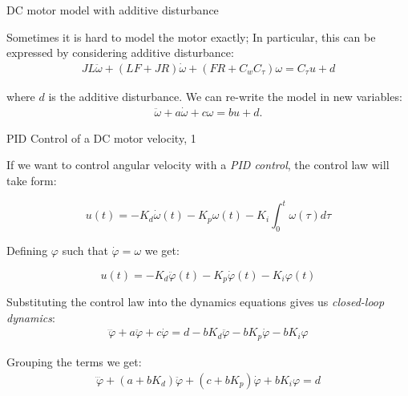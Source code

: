 \documentclass{beamer}
\begin{document}
\begin{frame}{DC motor model with additive disturbance}
	\begin{flushleft}
		
		Sometimes it is hard to model the motor exactly; In particular, this can be expressed by considering additive disturbance:
		\begin{align}
			JL \ddot \omega  + (LF+JR) \dot \omega   +( FR+C_w C_\tau)\omega =
			C_\tau u + d
		\end{align}
		
		where $d$ is the additive disturbance. We can re-write the model in new variables:
		\begin{align}
			\ddot \omega  + a\dot \omega  + c\omega =
			b u + d.
		\end{align}
		
	\end{flushleft}
\end{frame}


\begin{frame}{PID Control of a DC motor velocity, 1}
	\begin{flushleft}
		
		If we want to control angular velocity with a \emph{PID control}, the control law will take form:
		
		\begin{equation}
			u(t) =  - K_d \dot \omega(t) - K_p \omega(t) - K_i \int_0^t \omega(\tau) d\tau
		\end{equation}
		
		Defining $\varphi$ such that $\dot \varphi = \omega$ we get:
		
		\begin{equation}
			u(t) = - K_d \ddot \varphi(t) - K_p \dot \varphi(t) - K_i \varphi(t)
		\end{equation}
		
		Substituting the control law into the dynamics equations gives us \emph{closed-loop dynamics}:
		\begin{align}
			\dddot \varphi  + a\ddot \varphi  + c\dot\varphi =
			d - bK_d \ddot \varphi - bK_p \dot \varphi - bK_i \varphi
		\end{align}
		
		Grouping the terms we get:
		\begin{align}
			\dddot \varphi  + (a+bK_d)\ddot \varphi  + (c+bK_p)\dot\varphi + bK_i \varphi = d
		\end{align}
		
	\end{flushleft}
\end{frame}
\end{document}
